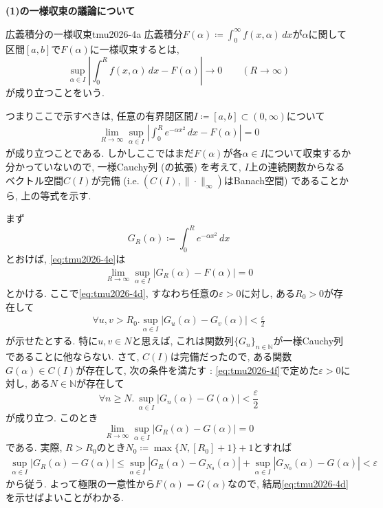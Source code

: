 \documentclass[titlepage]{jsarticle}
\numberwithin{equation}{section}
\newcommand{\N}{\mathbb{N}}%
\begin{document}
\textbf{(1)の一様収束の議論について}
\begin{dfn}{広義積分の一様収束}{tmu2026-4a}
広義積分$F(\alpha) \coloneq \int_0^\infty f(x, \alpha)\, dx$が$\alpha$に関して区間$[a, b]$で$F(\alpha)$に一様収束するとは, 
\[
\sup_{\alpha \in I}\left|\int_0^R f(x, \alpha)\,dx - F(\alpha)\right| \to 0\qquad (R \to \infty)
\]
が成り立つことをいう.
\end{dfn}
つまりここで示すべきは, 任意の有界閉区間$I\coloneq [a,b]\subset (0, \infty)$について
\begin{align}
\lim_{R \to \infty} \sup_{\alpha \in I} \left|\int_0^R e^{-\alpha x^2}\,dx - F(\alpha)\right| = 0 \label{eq:tmu2026-4e}
\end{align}
が成り立つことである. しかしここではまだ$F(\alpha)$が各$\alpha \in I$について収束するか分かっていないので, 一様Cauchy列 (の拡張) を考えて, $I$上の連続関数からなるベクトル空間$C(I)$が完備 (i.e.$\:\left(C(I), \|\cdot\|_\infty\right)$はBanach空間) であることから, 上の等式を示す.

まず
\[
G_R(\alpha) \coloneq \int_0^R e^{-\alpha x^2}\, dx
\]
とおけば, \eqref{eq:tmu2026-4e}は
\begin{align*}
\lim_{R \to \infty} \sup_{\alpha \in I}|G_R(\alpha) - F(\alpha)| = 0
\end{align*}
とかける. ここで\eqref{eq:tmu2026-4d}, すなわち任意の$\varepsilon > 0$に対し, ある$R_0 > 0$が存在して
\begin{align}
\forall u, v > R_0. \sup_{\alpha \in I} |G_u(\alpha) - G_v(\alpha)| < \frac{\varepsilon}{2} \label{eq:tmu2026-4f}
\end{align}
が示せたとする. 特に$u,v \in N$と思えば, これは関数列$\{G_n\}_{n\in \N}$が一様Cauchy列であることに他ならない. さて, $C(I)$は完備だったので, ある関数$G(\alpha) \in C(I)$が存在して, 次の条件を満たす : \eqref{eq:tmu2026-4f}で定めた$\varepsilon > 0$に対し, ある$N\in\N$が存在して
\[
\forall n \ge N.\,\sup_{\alpha \in I} |G_n(\alpha) - G(\alpha)| < \frac{\varepsilon}{2}
\]
が成り立つ. このとき
\[
\lim_{R \to \infty}\sup_{\alpha \in I} |G_R(\alpha) - G(\alpha)| = 0
\]
である. 実際, $R > R_0$のとき$N_0 \coloneq \max\{N, [R_0]+1\}+1$とすれば
\begin{align*}
\sup_{\alpha \in I} |G_R(\alpha) - G(\alpha)| \le \sup_{\alpha \in I} |G_R(\alpha)-G_{N_0}(\alpha)| + \sup_{\alpha \in I} |G_{N_0}(\alpha) - G(\alpha)| < \varepsilon
\end{align*}
から従う. よって極限の一意性から$F(\alpha) = G(\alpha)$なので, 結局\eqref{eq:tmu2026-4d}を示せばよいことがわかる.
\end{document}
